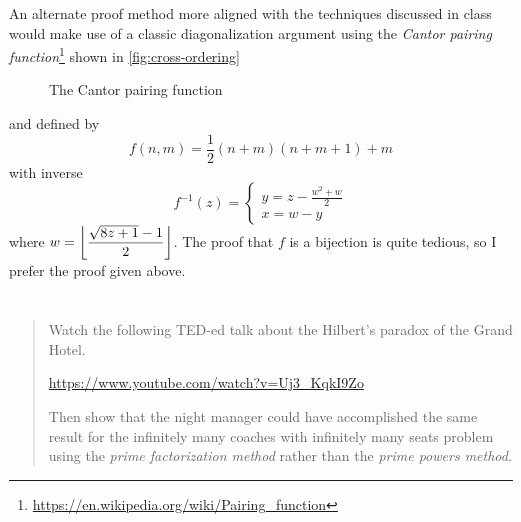 \documentclass{article}
\begin{document}
An alternate proof method more aligned with the techniques discussed in class would make use of a
classic diagonalization argument using the \textit{Cantor pairing
    function}\footnote{\url{https://en.wikipedia.org/wiki/Pairing_function}} shown in
\autoref{fig:cross-ordering}
\begin{figure}[h]
    \centering
    \caption{The Cantor pairing function}\label{fig:cross-ordering}
\end{figure}

and defined by
\[f(n, m) = \frac{1}{2}(n + m)(n + m + 1) + m\]
with inverse
\[f^{-1}(z) = \begin{cases}y = z - \frac{w^2 + w}{2}\\ x = w - y\end{cases}\]
where $\displaystyle w = \floor*{\frac{\sqrt{8z + 1} - 1}{2}}$. The proof that $f$ is a bijection
is quite tedious, so I prefer the proof given above.

\section{}
\begin{quote}
    Watch the following TED-ed talk about the Hilbert's paradox of the Grand
    Hotel.
    \begin{center}
        \url{https://www.youtube.com/watch?v=Uj3_KqkI9Zo}
    \end{center}
    Then show that the night manager could have accomplished the same result
    for the infinitely many coaches with infinitely many seats problem using
    the \textit{prime factorization method} rather than the \textit{prime
        powers method}.
\end{quote}

\end{document}
